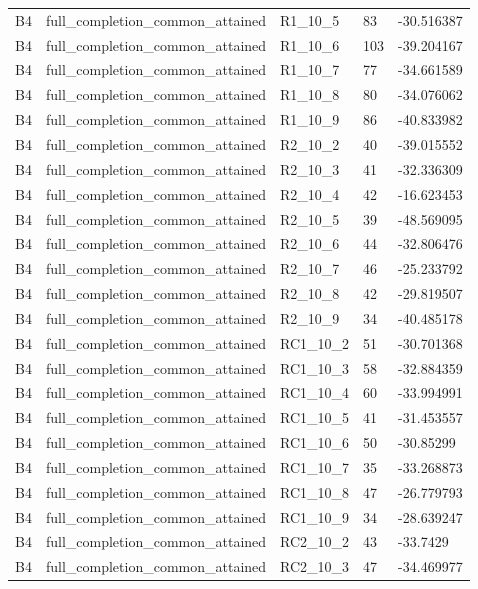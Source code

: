 \begin{longtable}{lllll}
B4 & full\_completion\_common\_attained & R1\_10\_5 & 83 & -30.516387 \\
B4 & full\_completion\_common\_attained & R1\_10\_6 & 103 & -39.204167 \\
B4 & full\_completion\_common\_attained & R1\_10\_7 & 77 & -34.661589 \\
B4 & full\_completion\_common\_attained & R1\_10\_8 & 80 & -34.076062 \\
B4 & full\_completion\_common\_attained & R1\_10\_9 & 86 & -40.833982 \\
B4 & full\_completion\_common\_attained & R2\_10\_2 & 40 & -39.015552 \\
B4 & full\_completion\_common\_attained & R2\_10\_3 & 41 & -32.336309 \\
B4 & full\_completion\_common\_attained & R2\_10\_4 & 42 & -16.623453 \\
B4 & full\_completion\_common\_attained & R2\_10\_5 & 39 & -48.569095 \\
B4 & full\_completion\_common\_attained & R2\_10\_6 & 44 & -32.806476 \\
B4 & full\_completion\_common\_attained & R2\_10\_7 & 46 & -25.233792 \\
B4 & full\_completion\_common\_attained & R2\_10\_8 & 42 & -29.819507 \\
B4 & full\_completion\_common\_attained & R2\_10\_9 & 34 & -40.485178 \\
B4 & full\_completion\_common\_attained & RC1\_10\_2 & 51 & -30.701368 \\
B4 & full\_completion\_common\_attained & RC1\_10\_3 & 58 & -32.884359 \\
B4 & full\_completion\_common\_attained & RC1\_10\_4 & 60 & -33.994991 \\
B4 & full\_completion\_common\_attained & RC1\_10\_5 & 41 & -31.453557 \\
B4 & full\_completion\_common\_attained & RC1\_10\_6 & 50 & -30.85299 \\
B4 & full\_completion\_common\_attained & RC1\_10\_7 & 35 & -33.268873 \\
B4 & full\_completion\_common\_attained & RC1\_10\_8 & 47 & -26.779793 \\
B4 & full\_completion\_common\_attained & RC1\_10\_9 & 34 & -28.639247 \\
B4 & full\_completion\_common\_attained & RC2\_10\_2 & 43 & -33.7429 \\
B4 & full\_completion\_common\_attained & RC2\_10\_3 & 47 & -34.469977 \\

\end{longtable}
